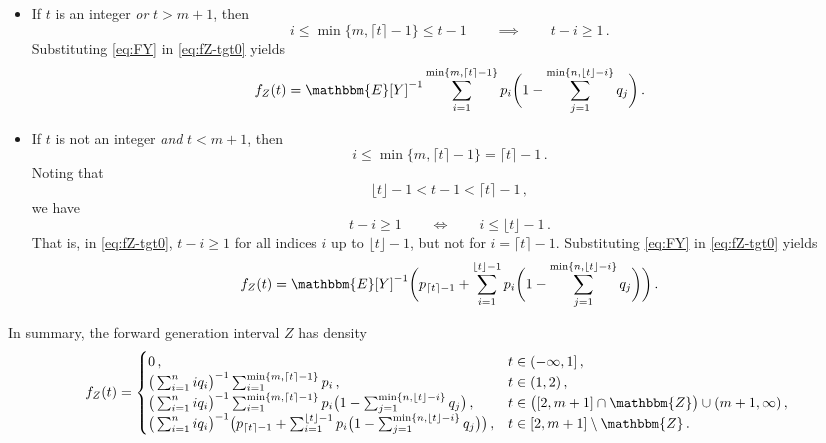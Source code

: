 \documentclass[12pt]{article}
\begin{document}
\begin{itemize}
  \item If $t$ is an integer \textit{or} $t > m + 1$, then
    \begin{equation*}
      i \leq \min\{m,\lceil t \rceil-1\} \leq t-1 \qquad\implies\qquad t-i \geq 1\,.
    \end{equation*}
    Substituting \eqref{eq:FY} in \eqref{eq:fZ-tgt0} yields
    \begin{equation}
      f_Z(t) = \mathbbm{E}[Y]^{-1} \sum_{i=1}^{\min\{m, \lceil t \rceil-1\}} p_i \bigg(1   - \sum_{j=1}^{\min\{n,\lfloor t \rfloor-i\}} q_j\bigg)\,.
    \end{equation}
  \item If $t$ is not an integer \textit{and} $t < m + 1$, then
    \begin{equation*}
      i \leq \min\{m,\lceil t \rceil-1\} = \lceil t \rceil-1\,.
    \end{equation*}
    Noting that
    \begin{equation*}
      \lfloor t \rfloor-1 < t-1 < \lceil t \rceil-1\,,
    \end{equation*}
    we have
    \begin{equation*}
      t-i \geq 1 \qquad\Longleftrightarrow\qquad i \leq \lfloor t \rfloor-1\,.
    \end{equation*}
    That is, in \eqref{eq:fZ-tgt0}, $t-i \geq 1$ for all indices $i$
    up to $\lfloor t \rfloor-1$, but not for $i = \lceil t \rceil-1$.
    Substituting \eqref{eq:FY} in \eqref{eq:fZ-tgt0} yields
    \begin{equation}
      f_Z(t) = \mathbbm{E}[Y]^{-1} \bigg(p_{\lceil t \rceil-1} + \sum_{i=1}^{\lfloor t \rfloor-1} p_i \bigg(1 - \sum_{j=1}^{\min\{n,\lfloor t \rfloor-i\}} q_j\bigg)\bigg)\,.
    \end{equation}
\end{itemize}
%
In summary, the forward generation interval $Z$ has density
%
\begin{equation}
  f_Z(t) = 
  \begin{cases}
    0\,, & t \in (-\infty,1]\,, \\
    \big(\sum_{i=1}^{n} i q_i\big)^{-1} \sum_{i=1}^{\min\{m, \lceil t \rceil-1\}} p_i\,, & t \in (1,2)\,, \\
    \big(\sum_{i=1}^{n} i q_i\big)^{-1} \sum_{i=1}^{\min\{m, \lceil t \rceil-1\}} p_i \big(1   - \sum_{j=1}^{\min\{n,\lfloor t \rfloor-i\}} q_j\big)\,, & t \in \big([2,m+1] \cap \mathbbm{Z}\big) \cup (m+1,\infty)\,, \\
    \big(\sum_{i=1}^{n} i q_i\big)^{-1} \big(p_{\lceil t \rceil-1} + \sum_{i=1}^{\lfloor t \rfloor-1} p_i \big(1 - \sum_{j=1}^{\min\{n,\lfloor t \rfloor-i\}} q_j\big)\big)\,, & t \in [2,m+1] \setminus \mathbbm{Z}\,.
  \end{cases}
\end{equation}
\end{document}
